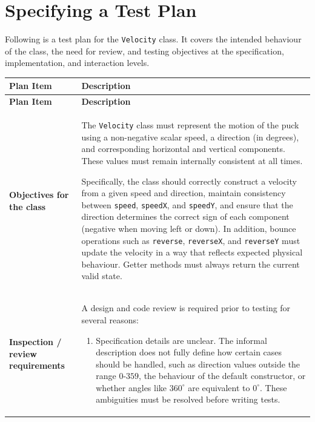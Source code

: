 \section{Specifying a Test Plan}

Following is a test plan for the \texttt{Velocity} class. 
It covers the intended behaviour of the class, the need for review, and testing objectives 
at the specification, implementation, and interaction levels.

\renewcommand{\arraystretch}{1.3}

\begin{longtable}{|p{4cm}|p{11cm}|}
\hline
\textbf{Plan Item} & \textbf{Description} \\
\hline
\endfirsthead

\hline
\textbf{Plan Item} & \textbf{Description} \\
\hline
\endhead

\hline
\endfoot

\hline
\endlastfoot

\textbf{Objectives for the class} &
The \texttt{Velocity} class must represent the motion of the puck using 
a non-negative scalar speed, a direction (in degrees), and corresponding 
horizontal and vertical components. These values must remain internally 
consistent at all times.

Specifically, the class should correctly construct a velocity from a 
given speed and direction, maintain consistency between \texttt{speed}, 
\texttt{speedX}, and \texttt{speedY}, and ensure that the direction 
determines the correct sign of each component (negative when moving 
left or down). In addition, bounce operations such as \texttt{reverse}, 
\texttt{reverseX}, and \texttt{reverseY} must update the velocity in a 
way that reflects expected physical behaviour. Getter methods must always 
return the current valid state. \\
\hline

\textbf{Inspection / review requirements} &
A design and code review is required prior to testing for several reasons:

\begin{enumerate}
\item Specification details are unclear. The informal description 
does not fully define how certain cases should be handled, such as 
direction values outside the range $0$-$359$, the behaviour of the 
default constructor, or whether angles like $360^\circ$ are equivalent 
to $0^\circ$. These ambiguities must be resolved before writing tests.


\end{enumerate}
\end{longtable}
